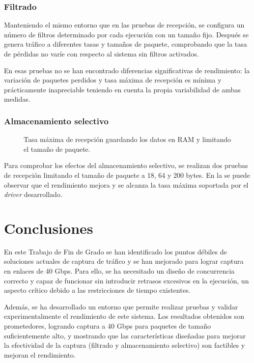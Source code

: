 \documentclass[oneside, draft]{epstfg}
\begin{document}
\subsection{Filtrado}

Manteniendo el mismo entorno que en las pruebas de recepción, se configura un número de filtros determinado por cada ejecución con un tamaño fijo. Después se genera tráfico a diferentes tasas y tamaños de paquete, comprobando que la tasa de pérdidas no varíe con respecto al sistema sin filtros activados.

En esas pruebas no se han encontrado diferencias significativas de rendimiento: la variación de paquetes perdidos y tasa máxima de recepción es mínima y prácticamente inapreciable teniendo en cuenta la propia variabilidad de ambas medidas.

\subsection{Almacenamiento selectivo}

\begin{figure}[hbtp]
\caption[Tasa máxima experimental limitando el tamaño de paquete]{Tasa máxima de recepción guardando los datos en RAM y limitando el tamaño de paquete.}
\label{fig:Validacion:CaplenEffects}
\end{figure}

Para comprobar los efectos del almacenamiento selectivo, se realizan dos pruebas de recepción limitando el tamaño de paquete a 18, 64 y 200 bytes. En la  se puede observar que el rendimiento mejora y se alcanza la tasa máxima soportada por el \textit{driver} desarrollado.

\chapter{Conclusiones}

En este Trabajo de Fin de Grado se han identificado los puntos débiles de soluciones actuales de captura de tráfico y se han mejorado para lograr captura en enlaces de 40 Gbps. Para ello, se ha necesitado un diseño de concurrencia correcto y capaz de funcionar sin introducir retrasos excesivos en la ejecución, un aspecto crítico debido a las restricciones de tiempo existentes.

Además, se ha desarrollado un entorno que permite realizar pruebas y validar experimentalmente el rendimiento de este sistema. Los resultados obtenidos son prometedores, logrando captura a 40 Gbps para paquetes de tamaño suficientemente alto, y mostrando que las características diseñadas para mejorar la efectividad de la captura (filtrado y almacenamiento selectivo) son factibles y mejoran el rendimiento.
\end{document}

